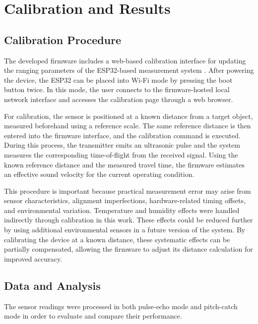 \section{Calibration and Results}
\subsection{Calibration Procedure}
The developed firmware includes a web-based calibration interface for
updating the ranging parameters of the ESP32-based measurement system
\cite{eee354_github_repo}.
After powering the device, the ESP32 can be placed into Wi-Fi mode by
pressing the boot button twice. In this mode, the user connects to the
firmware-hosted local network interface and accesses the calibration page
through a web browser.

For calibration, the sensor is positioned at a known distance from a
target object, measured beforehand using a reference scale. The same
reference distance is then entered into the firmware interface, and the
calibration command is executed. During this process, the transmitter
emits an ultrasonic pulse and the system measures the corresponding
time-of-flight from the received signal. Using the known reference
distance and the measured travel time, the firmware estimates an
effective sound velocity for the current operating condition.

This procedure is important because practical measurement error may
arise from sensor characteristics, alignment imperfections,
hardware-related timing offsets, and environmental variation.
Temperature and humidity effects were handled indirectly through
calibration in this work. These effects could be reduced further by
using additional environmental sensors in a future version of the
system. By calibrating the device at a known distance, these systematic
effects can be partially compensated, allowing the firmware to adjust
its distance calculation for improved accuracy.

\subsection{Data and Analysis}
The sensor readings were processed in both pulse-echo mode and
pitch-catch mode in order to evaluate and compare their performance.

